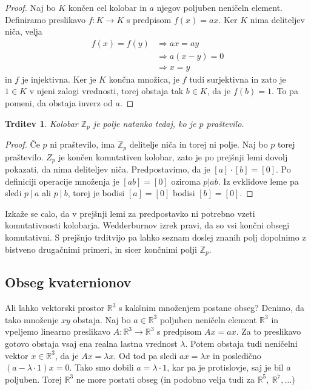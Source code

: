 \documentclass[10pt, a4paper]{article}
\newtheorem{trditev}[izr]{Trditev}
\newenvironment{noticeC}{%
  \tcolorbox[%
  notitle,
  empty,
  enhanced,  %
  breakable,
  coltext=black, 
  fontupper=\rmfamily,
  parbox=false,
  noparskip,
  sharp corners,
  boxrule=-1pt,  %
  frame hidden,
  left=7pt,  %
  right=7pt,
  top=5pt,
  bottom=5pt,
  before skip=2.5ex plus 2pt,
  after skip=2.5ex plus 2pt,
  overlay unbroken and last={%
  },
  ]}
{\endtcolorbox}
\newenvironment{dokaz}%
  {\begin{noticeC}\begin{proof}}%
  {\end{proof}\end{noticeC}}
\newcommand{\Z}{\mathbb {Z}}
\newcommand{\R}{\mathbb {R}}
\begin{document}
\begin{dokaz}
  Naj bo $K$ končen cel kolobar in $a$ njegov poljuben neničeln element.
  Definiramo preslikavo $f: K \to K$ s predpisom $f(x) = ax$.
  Ker $K$ nima deliteljev niča, velja 
  \begin{align*}
    f(x) = f(y) &\Rightarrow ax = ay\\
    &\Rightarrow a (x - y) = 0\\
    &\Rightarrow x = y
  \end{align*}
  in $f$ je injektivna. Ker je $K$ končna množica, je $f$ tudi surjektivna in zato je $1 \in K$
  v njeni zalogi vrednosti, torej obstaja tak $b \in K$, da je $f(b) = 1$.
  To pa pomeni, da obstaja inverz od $a$.
\end{dokaz}

\begin{trditev}
  Kolobar $\Z_p$ je polje natanko tedaj, ko je $p$ praštevilo.
\end{trditev}

\begin{dokaz}
  Če $p$ ni praštevilo, ima $\Z_p$ delitelje niča in torej ni polje.
  Naj bo $p$ torej praštevilo.
  $Z_p$ je končen komutativen kolobar, zato je po prejšnji lemi dovolj
  pokazati, da nima deliteljev niča.
  Predpostavimo, da je $[a] \cdot [b] = [0]$.
  Po definiciji operacije množenja je $[ab] = [0]$ oziroma $p | ab$.
  Iz evklidove leme pa sledi $p\ |\ a$ ali $p \ |\ b$, torej je bodisi $[a] = [0]$
  bodisi $[b] = [0].$
\end{dokaz}

Izkaže se calo, da v prejšnji lemi za predpostavko ni potrebno vzeti komutativnosti 
kolobarja.  Wedderburnov izrek pravi, da so vsi končni obsegi komutativni. S prejšnjo trditvijo pa lahko seznam doslej znanih polj dopolnimo z bistveno drugačnimi 
primeri, in sicer končnimi polji $\Z_p$.

\subsection{Obseg kvaternionov}

Ali lahko vektorski prostor $\R^3$ s kakšnim množenjem postane obseg?
Denimo, da tako množenje $xy$ obstaja.
Naj bo $a \in \R^3$ poljuben neničeln element $\R^3$ in vpeljemo linearno preslikavo $A: \R^3 \to \R^3$ 
s predpisom $Ax = ax$.
Za to preslikavo gotovo obstaja vsaj ena realna lastna vrednost $\lambda$.
Potem obstaja tudi neničelni vektor $x \in \R^3$, da je $Ax = \lambda x$.
Od tod pa sledi $ax = \lambda x$ in posledično $(a - \lambda \cdot 1) x = 0.$
Tako smo dobili $a = \lambda \cdot 1$, kar pa je protislovje, saj je bil $a$ poljuben.
Torej $\R^3$ ne more postati obseg (in podobno velja tudi za $\R^5,\ \R^7, \dots$)
\end{document}
